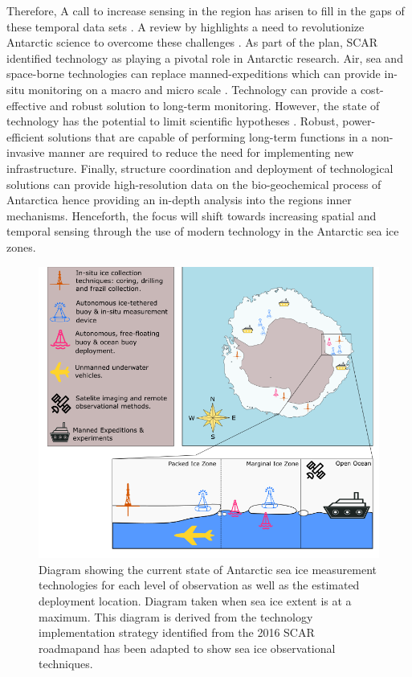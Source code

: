 Therefore, A call to increase sensing in the region has arisen to fill in the gaps of these temporal data sets \cite{kennicutt2019sustained}. A review by \textcite{kennicutt2016delivering} highlights a need to revolutionize Antarctic science to overcome these challenges \cite{kennicutt2016delivering}. As part of the plan, SCAR identified technology as playing a pivotal role in Antarctic research. Air, sea and space-borne technologies can replace manned-expeditions which can provide in-situ monitoring on a macro and micro scale \cite{kennicutt2016delivering}. Technology can provide a cost-effective and robust solution to long-term monitoring. However, the state of technology has the potential to limit scientific hypotheses \cite{kennicutt2016delivering}. Robust, power-efficient solutions that are capable of performing long-term functions in a non-invasive manner are required to reduce the need for implementing new infrastructure. Finally, structure coordination and deployment of technological solutions can provide high-resolution data on the bio-geochemical process of Antarctica hence providing an in-depth analysis into the regions inner mechanisms. Henceforth, the focus will shift towards increasing spatial and temporal sensing through the use of modern technology  in the Antarctic sea ice zones. \par

\begin{figure}[H]
    \centering
    \includegraphics[scale=0.5]{tech.png}
    \caption{ Diagram showing the current state of Antarctic sea ice measurement technologies for each level of observation as well as the estimated deployment location. Diagram taken when sea ice extent is at a maximum. This diagram is derived from the technology implementation strategy identified from the 2016 SCAR roadmap\cite{kennicutt2019sustained}\protect\footnotemark and has been adapted to show sea ice observational techniques. }
    \label{fig:chapter1_tech_diag}
\end{figure}

